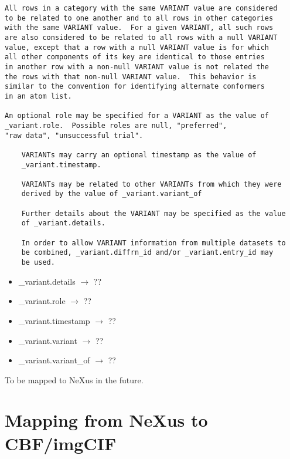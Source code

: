\documentclass[11pt]{article}
\begin{document}
{{{\begin{verbatim}
All rows in a category with the same VARIANT value are considered 
to be related to one another and to all rows in other categories
with the same VARIANT value.  For a given VARIANT, all such rows
are also considered to be related to all rows with a null VARIANT
value, except that a row with a null VARIANT value is for which
all other components of its key are identical to those entries
in another row with a non-null VARIANT value is not related the
the rows with that non-null VARIANT value.  This behavior is 
similar to the convention for identifying alternate conformers 
in an atom list.

An optional role may be specified for a VARIANT as the value of
_variant.role.  Possible roles are null, "preferred", 
"raw data", "unsuccessful trial".

    VARIANTs may carry an optional timestamp as the value of
    _variant.timestamp.
    
    VARIANTs may be related to other VARIANTs from which they were
    derived by the value of _variant.variant_of
    
    Further details about the VARIANT may be specified as the value
    of _variant.details.
    
    In order to allow VARIANT information from multiple datasets to
    be combined, _variant.diffrn_id and/or _variant.entry_id may
    be used. 
\end{verbatim}}

\begin{itemize}

\item{\_variant.details $\rightarrow$ ??}

\item{\_variant.role $\rightarrow$ ??}

\item{\_variant.timestamp $\rightarrow$ ??}

\item{\_variant.variant $\rightarrow$ ??}

\item{\_variant.variant\_of $\rightarrow$ ??}
\end{itemize}

To be mapped to NeXus in the future.


\section{Mapping from NeXus to CBF/imgCIF}
\label{Mapping from NeXus to CBF/imgCIF}

}}
\end{document}
